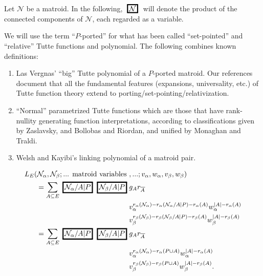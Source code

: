 \documentclass[Unicode]{cedram-alco}
\newcommand{\MVar}[1]{
  \setlength\fboxrule{1.5pt}
  \setlength\fboxsep{1.5pt}
  {\;\framebox{\ensuremath{#1}}\;}}
\begin{document}
Let $\mathcal{N}$ be a matroid.  In the following, $\MVar{\mathcal{N}}$ will
denote the product of the connected components of $\mathcal{N}$, each regarded as
a variable.

We will use the term ``$P$-ported'' for what has been called ``set-pointed'' and
``relative'' Tutte functions and polynomial. The following combines known definitions:
\begin{enumerate}
\item
  Las Vergnas' ``big'' Tutte polynomial of a $P$-ported matroid.  Our
references\cite{MR0419272,SetPointedLV,sdcPorted,TutteEx,RelTuttePolyDiaoHetyei}
document that all the fundamental features
(expansions, universality, etc.)
of Tutte function theory extend to porting/set-pointing/relativization.
\item
  ``Normal'' parametrized Tutte functions which
  are those that have rank-nullity generating function interpretations,
  according
to classifications given by Zaslavsky\cite{MR93a:05047},
and Bollobas and Riordan\cite{BollobasRiordanTuttePolyColored}, and
unified by Monaghan and Traldi\cite{Ellis-Monaghan-Traldi}.
\item Welsh and Kayibi's linking polynomial of a matroid pair\cite{WelshKayibiLinking}.
\end{enumerate}
  
\begin{defi}
\begin{equation}\label{bigportedpairpolydef}
  \begin{split}
    L_E(\mathcal{N}_\alpha,\mathcal{N_\beta};\text{... matroid variables } &
    , \text{...};
    \V_\alpha,\W_\alpha,\V_\beta,\W_\beta) \\
    =\sum_{A\subseteq E}\MVar{\mathcal{N}_\alpha/A|P}\MVar{\mathcal{N}_\beta/A|P}
& g_A r_{\overline{A}} \\
& \V_\alpha^{r_\alpha(\mathcal{N}_\alpha)-r_\alpha(\mathcal{N}_\alpha/A|P)-r_\alpha(A)} 
 \W_\alpha^{|A|-r_\alpha(A)} \\
& \V_\beta^{r_\beta(\mathcal{N}_\beta)-r_\beta(\mathcal{N}_\beta/A|P)-r_\beta(A)} 
 \W_\beta^{|A|-r_\beta(A)}  \\
 =
 \sum_{A\subseteq E}\MVar{\mathcal{N}_\alpha/A|P}\MVar{\mathcal{N}_\beta/A|P}
 & g_A r_{\overline{A}} \\
 & \V_\alpha^{r_\alpha(\mathcal{N}_\alpha)-r_\alpha(P\cup A)} 
 \W_\alpha^{|A|-r_\alpha(A)} \\
& \V_\beta^{r_\beta(\mathcal{N}_\beta)-r_\beta(P \cup A)} 
 \W_\beta^{|A|-r_\beta(A)}. 
  \end{split}
\end{equation}
\end{defi}
\end{document}
